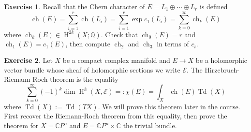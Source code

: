 \documentclass{amsart}
\theoremstyle{definition}
\newtheorem{exercise}{Exercise}
\newcommand{\C}{\mathbb{C}}
\newcommand{\Q}{\mathbb{Q}}
\DeclareMathOperator{\HH}{H}
\DeclareMathOperator{\Td}{Td}
\DeclareMathOperator{\ch}{ch}
\begin{document}
\begin{exercise}
    Recall that the Chern character of $E=L_1\oplus \cdots \oplus L_r$ is defined
    \begin{equation*}
        \ch(E) = \sum_{i=1}^r \ch(L_i) = \sum_{i=1}^r  \exp c_1(L_i) = \sum_{k=0}^\infty\ch_k(E)
    \end{equation*}
    where $\ch_k(E)\in\HH^{2k}(X;\Q)$.
    Check that $\ch_0(E)=r$ and $\ch_1(E)=c_1(E)$, then compute $\ch_2$ and $\ch_3$ in terms
    of $c_i$.
\end{exercise}

\begin{exercise}
    Let $X$ be a compact complex manifold and $E\to X$ be a holomorphic vector bundle whose
    sheaf of holomorphic sections we write $\mathscr{E}$. The Hirzebruch-Riemann-Roch theorem is the equality
    \begin{equation*}
        \sum_{k=0}^\infty (-1)^k\dim \HH^k(X, \mathscr{E}) =: \chi(E) = \int_X \ch(E)\Td(X)
    \end{equation*}
    where $\Td(X):=\Td(TX)$. We will prove this theorem later in the course.
    First recover the Riemann-Roch theorem from this equality, then
    prove the theorem for $X=\C P^n$ and $E=\C P^n\times\C$ the trivial bundle.
\end{exercise}
\end{document}
